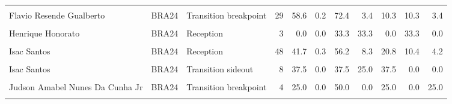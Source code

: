 \documentclass[
]{book}
\begin{document}
\begin{table}[!h]
{\begin{tabular}[t]{lllrrrrrrrr}
\addlinespace
\cellcolor{gray!10}{Flavio Resende Gualberto} & \cellcolor{gray!10}{BRA24} & \cellcolor{gray!10}{Reception} & \cellcolor{gray!10}{108} & \cellcolor{gray!10}{47.2} & \cellcolor{gray!10}{0.6} & \cellcolor{gray!10}{55.6} & \cellcolor{gray!10}{9.3} & \cellcolor{gray!10}{26.9} & \cellcolor{gray!10}{4.6} & \cellcolor{gray!10}{3.7}\\
Flavio Resende Gualberto & BRA24 & Transition breakpoint & 29 & 58.6 & 0.2 & 72.4 & 3.4 & 10.3 & 10.3 & 3.4\\
\cellcolor{gray!10}{Flavio Resende Gualberto} & \cellcolor{gray!10}{BRA24} & \cellcolor{gray!10}{Transition sideout} & \cellcolor{gray!10}{15} & \cellcolor{gray!10}{53.3} & \cellcolor{gray!10}{0.1} & \cellcolor{gray!10}{60.0} & \cellcolor{gray!10}{6.7} & \cellcolor{gray!10}{26.7} & \cellcolor{gray!10}{0.0} & \cellcolor{gray!10}{6.7}\\
Henrique Honorato & BRA24 & Reception & 3 & 0.0 & 0.0 & 33.3 & 33.3 & 0.0 & 33.3 & 0.0\\
\cellcolor{gray!10}{Henrique Honorato} & \cellcolor{gray!10}{BRA24} & \cellcolor{gray!10}{Transition sideout} & \cellcolor{gray!10}{3} & \cellcolor{gray!10}{66.7} & \cellcolor{gray!10}{0.0} & \cellcolor{gray!10}{66.7} & \cellcolor{gray!10}{0.0} & \cellcolor{gray!10}{33.3} & \cellcolor{gray!10}{0.0} & \cellcolor{gray!10}{0.0}\\
\addlinespace
Isac Santos & BRA24 & Reception & 48 & 41.7 & 0.3 & 56.2 & 8.3 & 20.8 & 10.4 & 4.2\\
\cellcolor{gray!10}{Isac Santos} & \cellcolor{gray!10}{BRA24} & \cellcolor{gray!10}{Transition breakpoint} & \cellcolor{gray!10}{15} & \cellcolor{gray!10}{73.3} & \cellcolor{gray!10}{0.1} & \cellcolor{gray!10}{73.3} & \cellcolor{gray!10}{20.0} & \cellcolor{gray!10}{6.7} & \cellcolor{gray!10}{0.0} & \cellcolor{gray!10}{0.0}\\
Isac Santos & BRA24 & Transition sideout & 8 & 37.5 & 0.0 & 37.5 & 25.0 & 37.5 & 0.0 & 0.0\\
\cellcolor{gray!10}{Judson Amabel Nunes Da Cunha Jr} & \cellcolor{gray!10}{BRA24} & \cellcolor{gray!10}{Reception} & \cellcolor{gray!10}{36} & \cellcolor{gray!10}{44.4} & \cellcolor{gray!10}{0.2} & \cellcolor{gray!10}{55.6} & \cellcolor{gray!10}{8.3} & \cellcolor{gray!10}{25.0} & \cellcolor{gray!10}{5.6} & \cellcolor{gray!10}{5.6}\\
Judson Amabel Nunes Da Cunha Jr & BRA24 & Transition breakpoint & 4 & 25.0 & 0.0 & 50.0 & 0.0 & 25.0 & 0.0 & 25.0\\
\addlinespace
\cellcolor{gray!10}{Judson Amabel Nunes Da Cunha Jr} & \cellcolor{gray!10}{BRA24} & \cellcolor{gray!10}{Transition sideout} & \cellcolor{gray!10}{1} & \cellcolor{gray!10}{100.0} & \cellcolor{gray!10}{0.0} & \cellcolor{gray!10}{100.0} & \cellcolor{gray!10}{0.0} & \cellcolor{gray!10}{0.0} & \cellcolor{gray!10}{0.0} & \cellcolor{gray!10}{0.0}\\

\end{tabular}}
\end{table}
\end{document}
